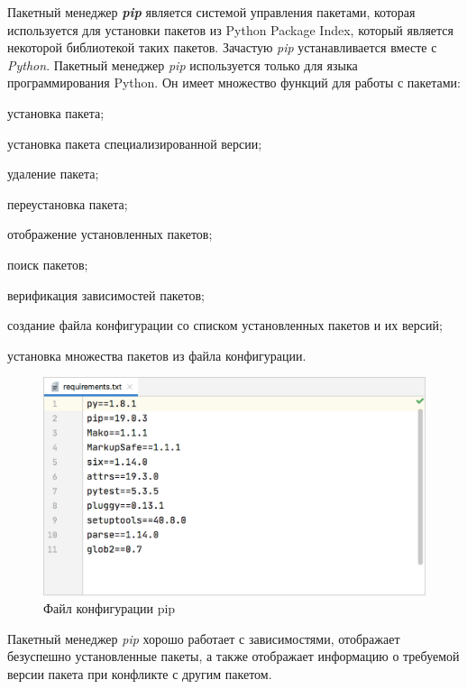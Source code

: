 Пакетный менеджер \textbf{\textit{pip}} является системой управления пакетами, которая используется для установки пакетов из Python Package Index, который является некоторой библиотекой таких пакетов. Зачастую \textit{pip} устанавливается вместе с \textit{Python}. Пакетный менеджер \textit{pip} используется только для языка программирования Python. 
Он имеет множество функций для работы с пакетами:

\begin{textitemize}
	\item установка пакета;
	\item установка пакета специализированной версии;
	\item удаление пакета;
	\item переустановка пакета;
	\item отображение установленных пакетов;
	\item поиск пакетов;
	\item верификация зависимостей пакетов;
	\item создание файла конфигурации со списком установленных пакетов и их версий;
	\item установка множества пакетов из файла конфигурации.
\end{textitemize}

\begin{figure}[H]
	\includegraphics[scale=0.3]{author/part5/figures/pip.png}
	\caption{Файл конфигурации pip}
	\label{fig:pip}
\end{figure}

Пакетный менеджер \textit{pip} хорошо работает с зависимостями, отображает безуспешно установленные пакеты, а также отображает информацию о требуемой версии пакета при конфликте с другим пакетом.

